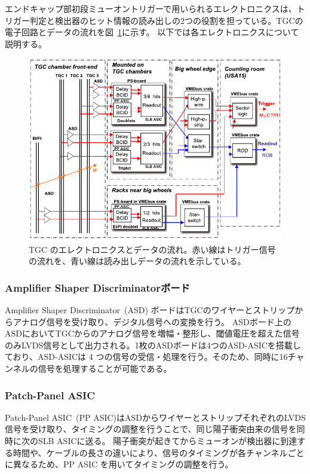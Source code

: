 エンドキャップ部初段ミューオントリガーで用いられるエレクトロニクスは、トリガー判定と検出器のヒット情報の読み出しの2つの役割を担っている。TGCの電子回路とデータの流れを図~\ref{fig:TGC_electro}に示す。
以下では各エレクトロニクスについて説明する。

\begin{figure}[tb]
  \centering
  \includegraphics[clip, width=14cm]{fig/3/electronics.pdf}
  \caption{TGC のエレクトロニクスとデータの流れ\cite{Aad:1129811}。赤い線はトリガー信号の流れを、青い線は読み出しデータの流れを示している。}
  \label{fig:TGC_electro}
\end{figure}

\subsubsection{Amplifier Shaper Discriminatorボード}
Amplifier Shaper Discriminator~(ASD) ボードはTGCのワイヤーとストリップからアナログ信号を受け取り、デジタル信号への変換を行う。
ASDボード上のASDにおいてTGCからのアナログ信号を増幅・整形し、閾値電圧を超えた信号のみLVDS信号として出力される。1枚のASDボードは4つのASD-ASICを搭載しており、ASD-ASICは 4 つの信号の受信・処理を行う。そのため、同時に16チャンネルの信号を処理することが可能である。

\subsubsection{Patch-Panel ASIC}
Patch-Panel ASIC~(PP ASIC)はASDからワイヤーとストリップそれぞれのLVDS信号を受け取り、タイミングの調整を行うことで、同じ陽子衝突由来の信号を同時に次のSLB ASICに送る。
陽子衝突が起きてからミューオンが検出器に到達する時間や、ケーブルの長さの違いにより、信号のタイミングが各チャンネルごとに異なるため、PP ASIC を用いてタイミングの調整を行う。

